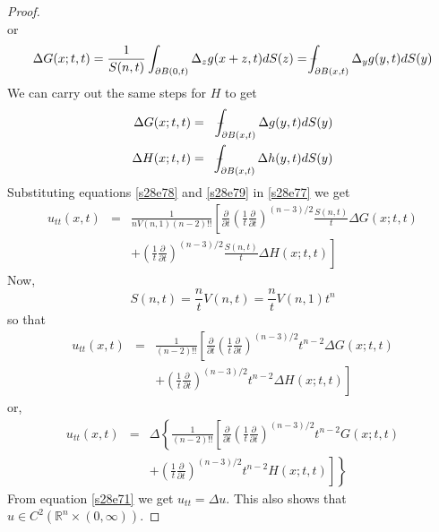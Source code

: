 \documentclass{article}
\newcommand{\fint}{\mbox{--}\mkern-16mu\int}
\theoremstyle{plain}
\numberwithin{thm}{section}
\theoremstyle{plain}
\numberwithin{prop}{section}
\theoremstyle{definition}
\numberwithin{defn}{section}
\theoremstyle{remark}
\numberwithin{equation}{section}
\begin{document}
\begin{proof}
\[\]
or
\[
\Delta G(x;t,t) = \frac{1}{S(n,t)}\int_{\partial B(0,t)} \Delta_z g(x + z, t)dS(z) = 
\fint_{\partial B(x,t)} \Delta_y g(y, t)dS(y)
\]
We can carry out the same steps for $H$ to get
\begin{eqnarray}
\Delta G(x;t,t) &=& \fint_{\partial B(x,t)} \Delta g(y, t)dS(y) \label{s28e78} \\
\Delta H(x;t,t) &=& \fint_{\partial B(x,t)} \Delta h(y, t)dS(y) \label{s28e79}
\end{eqnarray}
Substituting equations \eqref{s28e78} and \eqref{s28e79} in \eqref{s28e77} we get
\begin{eqnarray*}
u_{tt}(x,t) &=& \frac{1}{nV(n,1)(n-2)!!}\left[\frac{\partial}{\partial t}
\left(\frac{1}{t}\frac{\partial}{\partial t}\right)^{(n-3)/2}\frac{S(n,t)}{t}\Delta G(x;t,t) 
\right.  \\
& & + \left.
\left(\frac{1}{t}\frac{\partial}{\partial t}\right)^{(n-3)/2}\frac{S(n,t)}{t}\Delta H(x;t,t)\right]
\end{eqnarray*}
Now,
\[
S(n,t) = \frac{n}{t}V(n,t) = \frac{n}{t}V(n,1)t^n
\]
so that
\begin{eqnarray*}
u_{tt}(x,t) &=& \frac{1}{(n-2)!!}\left[\frac{\partial}{\partial t}
\left(\frac{1}{t}\frac{\partial}{\partial t}\right)^{(n-3)/2}t^{n-2}\Delta G(x;t,t) 
\right.  \\
& & + \left.
\left(\frac{1}{t}\frac{\partial}{\partial t}\right)^{(n-3)/2}t^{n-2}\Delta H(x;t,t)\right]
\end{eqnarray*}
or,
\begin{eqnarray*}
u_{tt}(x,t) &=& \Delta\left\{\frac{1}{(n-2)!!}\left[\frac{\partial}{\partial t}
\left(\frac{1}{t}\frac{\partial}{\partial t}\right)^{(n-3)/2}t^{n-2} G(x;t,t) 
\right.\right.  \\
& & + \left.\left.
\left(\frac{1}{t}\frac{\partial}{\partial t}\right)^{(n-3)/2}t^{n-2} H(x;t,t)\right]\right\}
\end{eqnarray*}
From equation \eqref{s28e71} we get $u_{tt} = \Delta u$. This also shows that $u \in C^2(\mathbb{R}^n \times 
(0,\infty))$.


\end{proof}
\end{document}
